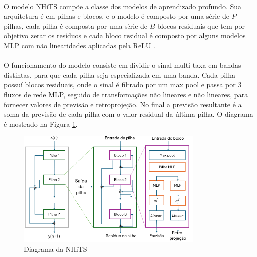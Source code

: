 \paragraph{} O modelo NHiTS compõe a classe dos modelos de aprendizado profundo. Sua arquitetura é em pilhas e blocos, e o modelo é composto por uma série de \(P\) pilhas, cada pilha é composta por uma série de \(B\) blocos residuais que tem por objetivo zerar os resíduos e cada bloco residual é composto por alguns modelos \ac{MLP} com não linearidades aplicadas pela \ac{ReLU} \cite{NHiTS22}.
\paragraph{} O funcionamento do modelo consiste em dividir o sinal multi-taxa em bandas distintas, para que cada pilha seja especializada em uma banda. Cada pilha possuí blocos residuais, onde o sinal é filtrado por um max pool e passa por 3 fluxos de rede \ac{MLP}, seguido de transformações não lineares e não lineares, para fornecer valores de previsão e retroprojeção. No final a previsão resultante é a soma da previsão de cada pilha com o valor residual da última pilha. O diagrama é mostrado na Figura \ref{fig:nhits_diagram}.

\begin{figure}
	\begin{center}
		\begin{center}
			\includegraphics[width=0.8\textwidth]{figuras/nhits_diagram.png}
			\caption{Diagrama da \acs{NHiTS}}
			\label{fig:nhits_diagram}
		\end{center}

	\end{center}
\end{figure}

